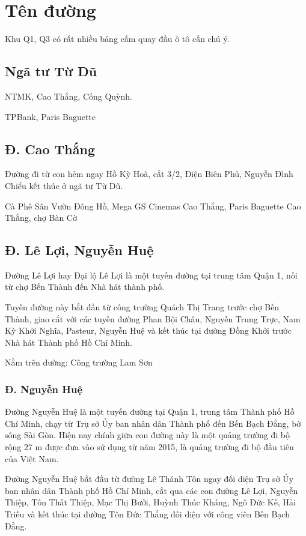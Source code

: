 \chapter{Tên đường}

Khu Q1, Q3 có rất nhiều bảng cấm quay đầu ô tô cần chú ý.

\section{Ngã tư Từ Dũ}

NTMK, Cao Thắng, Cống Quỳnh.

TPBank, Paris Baguette

\section{Đ. Cao Thắng}

Đường đi từ con hẻm ngay Hồ Kỳ Hoà, cắt 3/2, Điện Biên Phủ, Nguyễn Đình Chiểu kết thúc ở ngã tư Từ Dũ.

Cà Phê Sân Vườn Đông Hồ, Mega GS Cinemas Cao Thắng, Paris Baguette Cao Thắng, chợ Bàn Cờ

\section{Đ. Lê Lợi, Nguyễn Huệ}

Đường Lê Lợi hay Đại lộ Lê Lợi là một tuyến đường tại trung tâm Quận 1, nối từ chợ Bến Thành đến Nhà hát thành phố.

Tuyến đường này bắt đầu từ công trường Quách Thị Trang trước chợ Bến Thành, giao cắt với các tuyến đường Phan Bội Châu, Nguyễn Trung Trực, Nam Kỳ Khởi Nghĩa, Pasteur, Nguyễn Huệ và kết thúc tại đường Đồng Khởi trước Nhà hát Thành phố Hồ Chí Minh.

Nằm trên đường: Công trường Lam Sơn

\subsection{Đ. Nguyễn Huệ}

Đường Nguyễn Huệ là một tuyến đường tại Quận 1, trung tâm Thành phố Hồ Chí Minh, chạy từ Trụ sở Ủy ban nhân dân Thành phố đến Bến Bạch Đằng, bờ sông Sài Gòn. Hiện nay chính giữa con đường này là một quảng trường đi bộ rộng 27 m được đưa vào sử dụng từ năm 2015, là quảng trường đi bộ đầu tiên của Việt Nam.

Đường Nguyễn Huệ bắt đầu từ đường Lê Thánh Tôn ngay đối diện Trụ sở Ủy ban nhân dân Thành phố Hồ Chí Minh, cắt qua các con đường Lê Lợi, Nguyễn Thiệp, Tôn Thất Thiệp, Mạc Thị Bưởi, Huỳnh Thúc Kháng, Ngô Đức Kế, Hải Triều và kết thúc tại đường Tôn Đức Thắng đối diện với công viên Bến Bạch Đằng.

